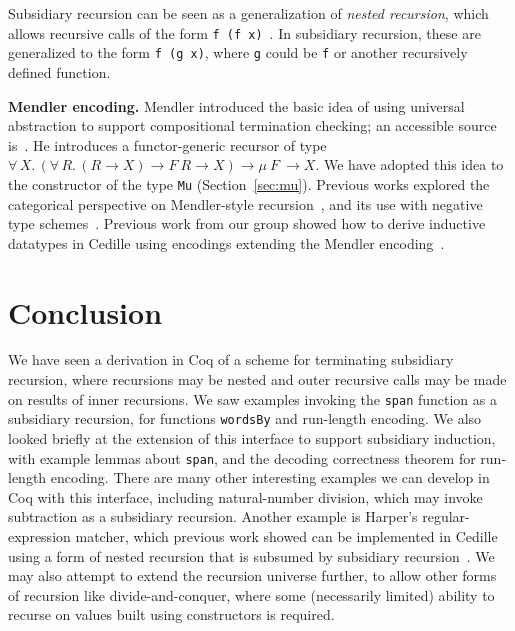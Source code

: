 \documentclass[a4paper,USenglish]{lipics-v2021}
\newcommand{\all}[2]{\forall\, #1.\, #2}
\begin{document}
Subsidiary recursion can be seen as a generalization of \emph{nested
recursion}, which allows recursive calls of the form \verb|f (f x)|~\cite{krauss10}.
In subsidiary recursion, these are generalized to the form
\verb|f (g x)|, where \verb|g| could be \verb|f| or another
recursively defined function.

\textbf{Mendler encoding.}  Mendler introduced the basic idea of using
universal abstraction to support compositional termination checking;
an accessible source is~\cite{mendler91}.  He introduces a
functor-generic recursor of type $\all{X}{(\all{R}{(R \to X) \to F\ R
    \to X}) \to \mu\ F\ \to X}$. We have adopted this idea to the
constructor of the type \verb|Mu| (Section~\ref{sec:mu}).  Previous
works explored the categorical perspective on Mendler-style
recursion~\cite{uustalu99}, and its use with negative type
schemes~\cite{ahn11}.  Previous work from our group showed
how to derive inductive datatypes in Cedille using encodings
extending the Mendler encoding~\cite{firsov+18b,firsov+18a,stump18}.

\section{Conclusion}

We have seen a derivation in Coq of a scheme for terminating
subsidiary recursion, where recursions may be nested and outer
recursive calls may be made on results of inner recursions.  We saw
examples invoking the \verb|span| function as a subsidiary recursion,
for functions \verb|wordsBy| and run-length encoding.  We also looked
briefly at the extension of this interface to support subsidiary
induction, with example lemmas about \verb|span|, and the decoding
correctness theorem for run-length encoding.  There are many other
interesting examples we can develop in Coq with this interface,
including natural-number division, which may invoke subtraction as a
subsidiary recursion.  Another example is Harper's regular-expression
matcher, which previous work showed can be implemented in Cedille
using a form of nested recursion that is subsumed by subsidiary
recursion~\cite{stump20}.  We may also attempt to extend the recursion
universe further, to allow other forms of recursion like
divide-and-conquer, where some (necessarily limited) ability to
recurse on values built using constructors is required.

\pagebreak

\end{document}
